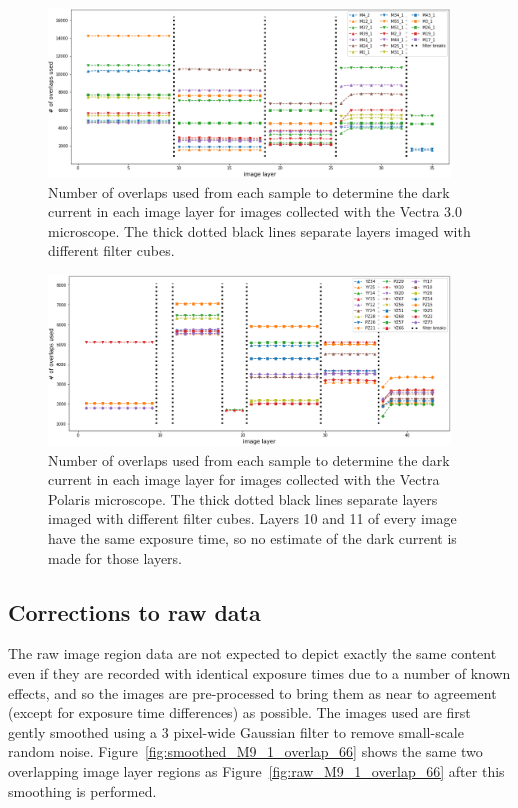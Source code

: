 \documentclass[letterpaper,11pt]{article}
\newcommand{\reffig}[1]{Figure~\ref{#1}}
\begin{document}
\begin{figure}[!ht]
\centering
\includegraphics[width=0.95\textwidth]{images/methods/n_overlaps_used_vectra}
\caption{\footnotesize Number of overlaps used from each sample to determine the dark current in each image layer for images collected with the Vectra 3.0 microscope. The thick dotted black lines separate layers imaged with different filter cubes.}
\label{fig:n_overlaps_used_vectra}
\end{figure}

\begin{figure}[!ht]
\centering
\includegraphics[width=0.95\textwidth]{images/methods/n_overlaps_used_polaris}
\caption{\footnotesize Number of overlaps used from each sample to determine the dark current in each image layer for images collected with the Vectra Polaris microscope. The thick dotted black lines separate layers imaged with different filter cubes. Layers 10 and 11 of every image have the same exposure time, so no estimate of the dark current is made for those layers. }
\label{fig:n_overlaps_used_polaris}
\end{figure}

\subsection{Corrections to raw data}
\label{ssec:corrections_to_raw_data}

The raw image region data are not expected to depict exactly the same content even if they are recorded with identical exposure times due to a number of known effects, and so the images are pre-processed to bring them as near to agreement (except for exposure time differences) as possible. The images used are first gently smoothed using a 3 pixel-wide Gaussian filter to remove small-scale random noise. \reffig{fig:smoothed_M9_1_overlap_66} shows the same two overlapping image layer regions as \reffig{fig:raw_M9_1_overlap_66} after this smoothing is performed.
\end{document}
